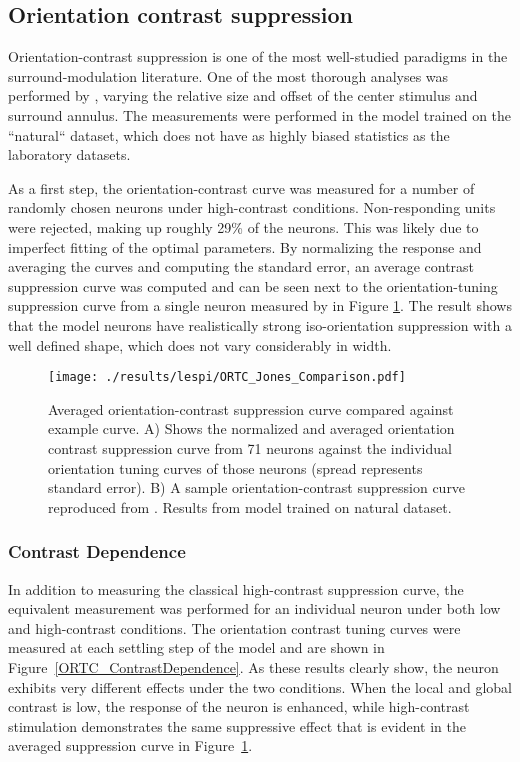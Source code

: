 \subsection{Orientation contrast suppression}

Orientation-contrast suppression is one of the most well-studied
paradigms in the surround-modulation literature. One of the most
thorough analyses was performed by \cite{Jones2002}, varying the
relative size and offset of the center stimulus and surround annulus.
The measurements were performed in the model trained on the
``natural`` dataset, which does not have as highly biased statistics
as the laboratory datasets.

As a first step, the orientation-contrast curve was measured for a
number of randomly chosen neurons under high-contrast conditions.
Non-responding units were rejected, making up roughly 29\% of the
neurons. This was likely due to imperfect fitting of the optimal
parameters. By normalizing the response and averaging the curves and
computing the standard error, an average contrast suppression curve
was computed and can be seen next to the orientation-tuning
suppression curve from a single neuron measured by \cite{Jones2002} in
Figure \ref{ORTC_Jones}. The result shows that the model neurons have
realistically strong iso-orientation suppression with a well defined
shape, which does not vary considerably in width.

\begin{figure}
	\centering
        \texttt{[image: ./results/lespi/ORTC\_Jones\_Comparison.pdf]}
	\caption[Averaged orientation-contrast suppression curve compared
      against \cite{Jones2002} example curve.]{Averaged
      orientation-contrast suppression curve compared against
      \cite{Jones2002} example curve. A) Shows the normalized and
      averaged orientation contrast suppression curve from 71 neurons
      against the individual orientation tuning curves of those
      neurons (spread represents standard error). B) A sample
      orientation-contrast suppression curve reproduced from
      \cite{Jones2002}. Results from model trained on natural
      dataset.}
	\label{ORTC_Jones}
\end{figure}

\subsubsection{Contrast Dependence}

In addition to measuring the classical high-contrast suppression
curve, the equivalent measurement was performed for an individual
neuron under both low and high-contrast conditions. The orientation
contrast tuning curves were measured at each settling step of the
model and are shown in Figure~\ref{ORTC_ContrastDependence}. As these
results clearly show, the neuron exhibits very different effects under
the two conditions. When the local and global contrast is low, the
response of the neuron is enhanced, while high-contrast stimulation
demonstrates the same suppressive effect that is evident in the
averaged suppression curve in Figure~\ref{ORTC_Jones}.

